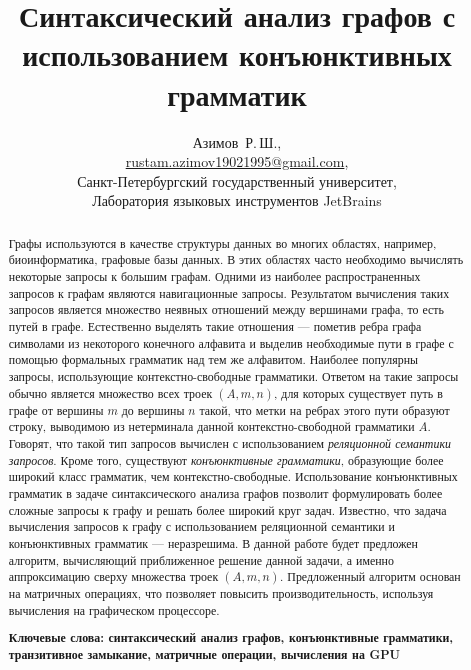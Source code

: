 \documentclass [a4paper] {article}
\begin{document}
	\title{Синтаксический анализ графов с использованием конъюнктивных грамматик}
	\author{
		Азимов~Р.\,Ш., \\ \url {rustam.azimov19021995@gmail.com}, \\
		Санкт-Петербургский государственный университет, \\
		Лаборатория языковых инструментов JetBrains 
	}
	
	\maketitle
	
	\begin{abstract}
		Графы используются в качестве структуры данных во многих областях, например, биоинформатика, графовые базы данных. В этих областях часто необходимо вычислять некоторые запросы к большим графам. Одними из наиболее распространенных запросов к графам являются навигационные запросы. Результатом вычисления таких запросов является множество неявных отношений между вершинами графа, то есть путей в графе. Естественно выделять такие отношения --- пометив ребра графа символами из некоторого конечного алфавита и выделив необходимые пути в графе с помощью формальных грамматик над тем же алфавитом. Наиболее популярны запросы, использующие контекстно-свободные грамматики. Ответом на такие запросы обычно является множество всех троек $(A, m, n)$, для которых существует путь в графе от вершины $m$ до вершины $n$ такой, что метки на ребрах этого пути образуют строку, выводимою из нетерминала данной контекстно-свободной грамматики $A$. Говорят, что такой тип запросов вычислен с использованием \textit{реляционной семантики запросов}. Кроме того, существуют \textit{конъюнктивные грамматики}, образующие более широкий класс грамматик, чем контекстно-свободные. Использование конъюнктивных грамматик в задаче синтаксического анализа графов позволит формулировать более сложные запросы к графу и решать более широкий круг задач. Известно, что задача вычисления запросов к графу с использованием реляционной семантики и конъюнктивных грамматик --- неразрешима. В данной работе будет предложен алгоритм, вычисляющий приближенное решение данной задачи, а именно аппроксимацию сверху множества троек $(A, m, n)$. Предложенный алгоритм основан на матричных операциях, что позволяет повысить производительность, используя вычисления на графическом процессоре.
		
		\vspace{1em}
		\textbf{Ключевые слова: синтаксический анализ графов, конъюнктивные грамматики, транзитивное замыкание, матричные операции, вычисления на GPU}  
	\end{abstract}
	
\end{document}
